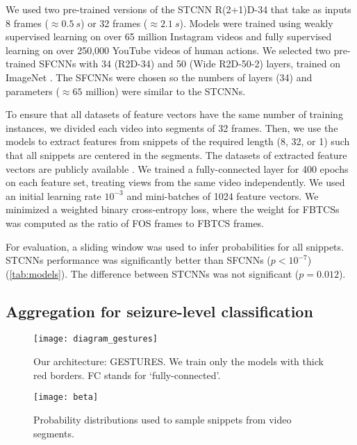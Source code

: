 We used two pre-trained versions of the \ac{STCNN} R(2+1)D-34 \cite{ghadiyaram_large-scale_2019} that take as inputs 8 frames ($\approx \SI{0.5}{s}$) or 32 frames ($\approx \SI{2.1}{s}$).
Models were trained using weakly supervised learning on over 65 million Instagram videos and fully supervised learning on over 250,000 YouTube videos of human actions.
We selected two pre-trained \acp{SFCNN} with 34 (R2D-34) and 50 (Wide R2D-50-2) layers, trained on ImageNet \cite{zagoruyko_wide_2016}.
The \acp{SFCNN} were chosen so the numbers of layers (34) and parameters ($\approx 65$ million) were similar to the \acp{STCNN}.

To ensure that all datasets of feature vectors have the same number of training instances, we divided each video into segments of 32 frames.
Then, we use the models to extract features from snippets of the required length (8, 32, or 1) such that all snippets are centered in the segments.
The datasets of extracted feature vectors are publicly available \cite{perez-garcia_data_2021}.
We trained a fully-connected layer for 400 epochs on each feature set, treating views from the same video independently.
We used an initial learning rate $10 ^ {-3}$ and mini-batches of 1024 feature vectors.
We minimized a weighted binary cross-entropy loss, where the weight for \acp{FBTCS} was computed as the ratio of \ac{FOS} frames to \ac{FBTCS} frames.

For evaluation, a sliding window was used to infer probabilities for all snippets.
\acp{STCNN} performance was significantly better than \acp{SFCNN} ($p < 10 ^ {-7}$) (\cref{tab:models}).
The difference between \acp{STCNN} was not significant ($p = 0.012$).


\subsection{Aggregation for seizure-level classification}
\label{sec:exp_agg}

\begin{figure}
  \centering
  \texttt{[image: diagram\_gestures]}
  \caption[Overview of the GESTURES architecture]{
    Our architecture: \acf{GESTURES}.
    We train only the models with thick red borders.
    FC stands for `fully-connected'.
  }
  \label{fig:gestures}
\end{figure}



\begin{figure}
  \centering
  \texttt{[image: beta]}
  \caption[Probability distributions to sample snippets from video segments]{
    Probability distributions used to sample snippets from video segments.
  }
  \label{fig:betas}
\end{figure}



